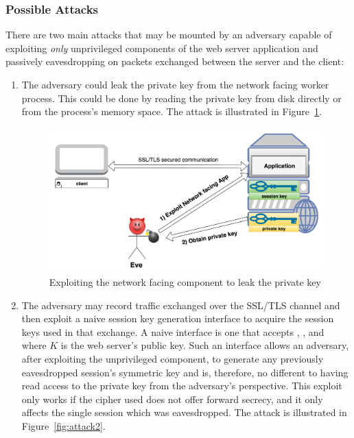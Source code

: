 \documentclass[../main.tex]{subfiles}
\begin{document}
\subsubsection*{Possible Attacks}

There are two main attacks that may be mounted by an adversary capable
of exploiting \textit{only} unprivileged components of the web
server application and passively eavesdropping on packets exchanged
between the server and the client:
 
\begin{enumerate}
  \item The adversary could leak the private key from the network
    facing worker process. This could be done by reading the private key
    from disk directly or from the process's memory space. The attack is
    illustrated in Figure~\ref{fig:attack1}.

    \begin{figure}[H] \centering
      \includegraphics[scale=0.15]{images/attack1.png}
      \caption{Exploiting the network facing component to leak the
        private key}
      \label{fig:attack1}
    \end{figure}

  \item The adversary may record traffic exchanged over the SSL/TLS
    channel and then exploit a naive session key generation interface to
    acquire the session keys used in that exchange. A naive interface is
    one that accepts \crandom, \srandom, and \premaster~ where $K$ is the
    web server's public key. Such an interface allows an adversary, after
    exploiting the unprivileged component, to generate any previously
    eavesdropped session's symmetric key and is, therefore, no different
    to having read access to the private key from the adversary's
    perspective. This exploit only works if the cipher used does not offer
    forward secrecy, and it only affects the single session which was
    eavesdropped. The attack is illustrated in Figure~\ref{fig:attack2}.


\end{enumerate}
\end{document}

